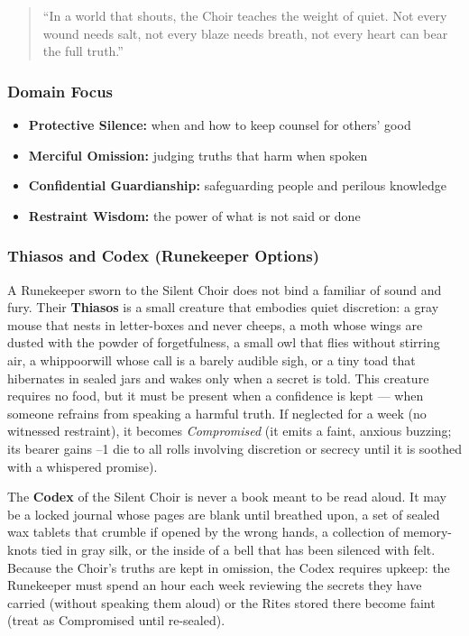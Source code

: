\begin{quote}
``In a world that shouts, the Choir teaches the weight of quiet. Not every wound needs salt, not every blaze needs breath, not every heart can bear the full truth.''
\end{quote}

\subsubsection*{Domain Focus}
\begin{itemize}
  \item \textbf{Protective Silence:} when and how to keep counsel for others' good
  \item \textbf{Merciful Omission:} judging truths that harm when spoken
  \item \textbf{Confidential Guardianship:} safeguarding people and perilous knowledge
  \item \textbf{Restraint Wisdom:} the power of what is not said or done
\end{itemize}

\subsubsection*{Thiasos and Codex (Runekeeper Options)}

A Runekeeper sworn to the Silent Choir does not bind a familiar of sound and fury. Their \textbf{Thiasos} is a small creature that embodies quiet discretion: a gray mouse that nests in letter-boxes and never cheeps, a moth whose wings are dusted with the powder of forgetfulness, a small owl that flies without stirring air, a whippoorwill whose call is a barely audible sigh, or a tiny toad that hibernates in sealed jars and wakes only when a secret is told. This creature requires no food, but it must be present when a confidence is kept --- when someone refrains from speaking a harmful truth. If neglected for a week (no witnessed restraint), it becomes \textit{Compromised} (it emits a faint, anxious buzzing; its bearer gains --1 die to all rolls involving discretion or secrecy until it is soothed with a whispered promise).

The \textbf{Codex} of the Silent Choir is never a book meant to be read aloud. It may be a locked journal whose pages are blank until breathed upon, a set of sealed wax tablets that crumble if opened by the wrong hands, a collection of memory-knots tied in gray silk, or the inside of a bell that has been silenced with felt. Because the Choir's truths are kept in omission, the Codex requires upkeep: the Runekeeper must spend an hour each week reviewing the secrets they have carried (without speaking them aloud) or the Rites stored there become faint (treat as Compromised until re-sealed).

